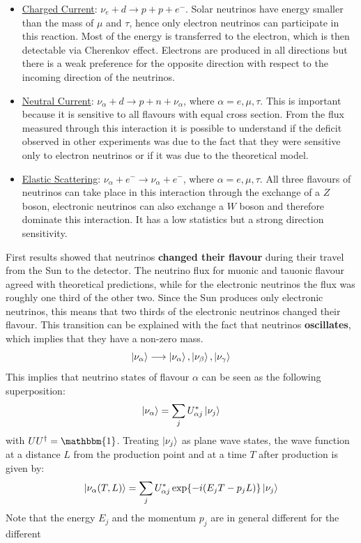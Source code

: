 \documentclass[10.75pt,a4paper,openright,bottom=2cm]{article}
\begin{document}
\begin{itemize}
    \item \underline{Charged Current}: $\nu_e+d\to p+p+e^-$. Solar neutrinos have energy smaller than the mass of $\mu$ and $\tau$, hence only electron neutrinos can participate in this reaction. Most of the energy is transferred to the electron, which is then detectable via Cherenkov effect. Electrons are produced in all directions but there is a weak preference for the opposite direction with respect to the incoming direction of the neutrinos.
    \item \underline{Neutral Current}: $\nu_\alpha+d\to p+n+\nu_\alpha$, where $\alpha=e,\mu,\tau$. This is important because it is sensitive to all flavours with equal cross section. From the flux measured through this interaction it is possible to understand if the deficit observed in other experiments was due to the fact that they were sensitive only to electron neutrinos or if it was due to the theoretical model.
    \item \underline{Elastic Scattering}: $\nu_\alpha+e^-\to\nu_\alpha+e^-$, where $\alpha=e,\mu,\tau$. All three flavours of neutrinos can take place in this interaction through the exchange of a $Z$ boson, electronic neutrinos can also exchange a $W$ boson and therefore dominate this interaction. It has a low statistics but a strong direction sensitivity. 
\end{itemize}
First results showed that neutrinos \textbf{changed their flavour} during their travel from the Sun to the detector. The neutrino flux for muonic and tauonic flavour agreed with theoretical predictions, while for the electronic neutrinos the flux was roughly one third of the other two. Since the Sun produces only electronic neutrinos, this means that two thirds of the electronic neutrinos changed their flavour. This transition can be explained with the fact that neutrinos \textbf{oscillates}, which implies that they have a non-zero mass.
\[
\ket{\nu_\alpha}\longrightarrow\ket{\nu_\alpha},\ket{\nu_\beta},\ket{\nu_\gamma}
\]
This implies that neutrino states of flavour $\alpha$ can be seen as the following superposition:
\[
\ket{\nu_\alpha}=\sum_jU_{\alpha j}^*\ket{\nu_j}
\]
with $UU^\dagger=\mathbbm{1}$. Treating $\ket{\nu_j}$ as plane wave states, the wave function at a distance
$L$ from the production point and at a time $T$ after production is given by:
\[
\ket{\nu_\alpha(T,L)}=\sum_jU^*_{\alpha j}\exp{-i(E_jT-p_jL)}\ket{\nu_j}
\]
Note that the energy $E_j$ and the momentum $p_j$ are in general different for the different
\end{document}
